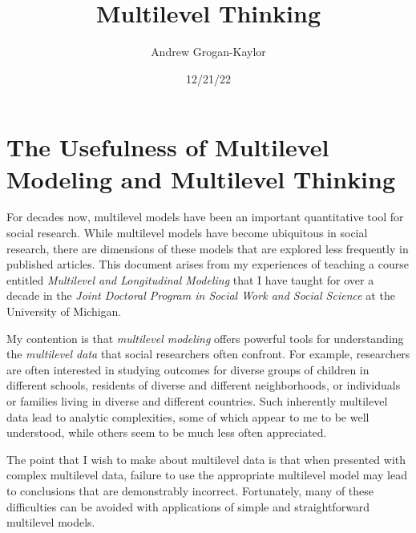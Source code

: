 \documentclass[
  letterpaper,
  DIV=11,
  numbers=noendperiod]{scrreprt}
\title{Multilevel Thinking}
\author{Andrew Grogan-Kaylor}
\date{12/21/22}
\renewcommand*\contentsname{Table of contents}
\newcommand\contentsname{Table of contents}
\begin{document}
\maketitle
\ifdefined\Shaded\renewenvironment{Shaded}{\begin{tcolorbox}[boxrule=0pt, enhanced, interior hidden, borderline west={3pt}{0pt}{shadecolor}, frame hidden, breakable, sharp corners]}{\end{tcolorbox}}\fi

\renewcommand*\contentsname{Table of contents}
{
\hypersetup{linkcolor=}
\setcounter{tocdepth}{2}
\tableofcontents
}

\hypertarget{the-usefulness-of-multilevel-modeling-and-multilevel-thinking}{%
\chapter{The Usefulness of Multilevel Modeling and Multilevel
Thinking}\label{the-usefulness-of-multilevel-modeling-and-multilevel-thinking}}

For decades now, multilevel models have been an important quantitative
tool for social research. While multilevel models have become ubiquitous
in social research, there are dimensions of these models that are
explored less frequently in published articles. This document arises
from my experiences of teaching a course entitled \emph{Multilevel and
Longitudinal Modeling} that I have taught for over a decade in the
\emph{Joint Doctoral Program in Social Work and Social Science} at the
University of Michigan.

My contention is that \emph{multilevel modeling} offers powerful tools
for understanding the \emph{multilevel data} that social researchers
often confront. For example, researchers are often interested in
studying outcomes for diverse groups of children in different schools,
residents of diverse and different neighborhoods, or individuals or
families living in diverse and different countries. Such inherently
multilevel data lead to analytic complexities, some of which appear to
me to be well understood, while others seem to be much less often
appreciated.

The point that I wish to make about multilevel data is that when
presented with complex multilevel data, failure to use the appropriate
multilevel model may lead to conclusions that are demonstrably
incorrect. Fortunately, many of these difficulties can be avoided with
applications of simple and straightforward multilevel models.
\end{document}

